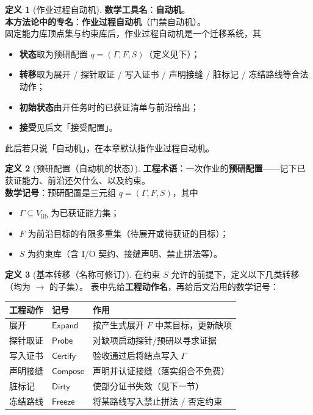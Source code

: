 \documentclass[UTF8,a4paper,11pt]{ctexart}
\theoremstyle{definition}
\newtheorem{definition}{定义}[section]
\theoremstyle{plain}
\theoremstyle{remark}
\numberwithin{figure}{section}
\numberwithin{table}{section}
\begin{document}
\begin{definition}[作业过程自动机]
\label{def:job-process-automaton}
\textbf{数学工具名}：\textbf{自动机}。\\
\textbf{本方法论中的专名}：\textbf{作业过程自动机}（门禁自动机）。\\
固定能力库顶点集与约束库后，作业过程自动机是一个迁移系统，其
\begin{itemize}
  \item \textbf{状态}取为预研配置 $q=(\Gamma,F,S)$（定义见下）；
  \item \textbf{转移}取为展开 / 探针取证 / 写入证书 / 声明接缝 / 脏标记 / 冻结路线等合法动作；
  \item \textbf{初始状态}由开任务时的已获证清单与前沿给出；
  \item \textbf{接受}见后文「接受配置」。
\end{itemize}
此后若只说「自动机」，在本章默认指作业过程自动机。
\end{definition}

\begin{definition}[预研配置（自动机的状态）]
\label{def:config}
\textbf{工程术语}：一次作业的\textbf{预研配置}——记下已获证能力、前沿还欠什么、以及约束。\\
\textbf{数学记号}：预研配置是三元组 $q=(\Gamma,F,S)$，其中
\begin{itemize}
  \item $\Gamma\subseteq V_{\mathrm{lib}}$ 为已获证能力集；
  \item $F$ 为前沿目标的有限多重集（待展开或待获证的目标）；
  \item $S$ 为约束库（含 I/O 契约、接缝声明、禁止拼法等）。
\end{itemize}
\end{definition}

\begin{definition}[基本转移（名称可修订）]
在约束 $S$ 允许的前提下，定义以下几类转移（均为 $\to$ 的子集）。
表中先给\textbf{工程动作名}，再给后文沿用的数学记号：
\begin{center}
\begin{tabular}{@{}L{3.0cm}L{2.6cm}L{8.0cm}@{}}
  \toprule
  工程动作 & 记号 & 作用 \\
  \midrule
  展开 & $\mathsf{Expand}$ & 按产生式展开 $F$ 中某目标，更新缺项 \\
  探针取证 & $\mathsf{Probe}$ & 对缺项启动探针/预研以寻求证据 \\
  写入证书 & $\mathsf{Certify}$ & 验收通过后将结点写入 $\Gamma$ \\
  声明接缝 & $\mathsf{Compose}$ & 声明并认证接缝（落实组合不免费） \\
  脏标记 & $\mathsf{Dirty}$ & 使部分证书失效（见下一节） \\
  冻结路线 & $\mathsf{Freeze}$ & 将某路线写入禁止拼法 / 否定约束 \\
  \bottomrule
\end{tabular}
\end{center}
\end{definition}
\end{document}
